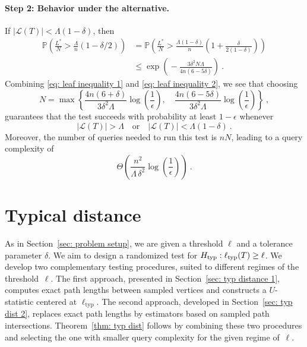 \documentclass[12pt]{article}
\begin{document}
\paragraph{Step 2: Behavior under the alternative.}    If $|\mathcal{L}(T)| < \Lambda(1-\delta)$, then
    \begin{align}
        \mathbb{P}\!\left(\frac{L^*}{N} > \frac{\Lambda}{n}(1-\delta/2)\right) 
        &= \mathbb{P}\!\left(\frac{L^*}{N} > \frac{\Lambda(1-\delta)}{n}\left(1+\frac{\delta}{2(1-\delta)}\right)\right) \nonumber \\
        &\le \exp\!\left(\!-\frac{3\delta^2 N \Lambda}{4n(6-5\delta)}\right)~. \label{eq: leaf inequality 2}
    \end{align}
    Combining \eqref{eq: leaf inequality 1} and \eqref{eq: leaf inequality 2}, we see that choosing
    \[
        N 
        = \max\left\{
            \frac{4n(6+\delta)}{3\delta^2 \Lambda}\log\!\left(\frac{1}{\epsilon}\right),
            \quad
            \frac{4n(6-5\delta)}{3\delta^2 \Lambda}\log\!\left(\frac{1}{\epsilon}\right)
        \right\}~,
    \]
    guarantees that the test succeeds with probability at least $1-\epsilon$ whenever 
    \[
        |\mathcal{L}(T)| > \Lambda 
        \quad \text{or} \quad 
        |\mathcal{L}(T)| < \Lambda(1-\delta)~.
    \]
    Moreover, the number of queries needed to run this test is $nN$, leading to a query complexity of
\[
    \Theta\!\left( \frac{n^2}{\Lambda\,\delta^2}\log\!\left(\frac{1}{\epsilon}\right)\right)~.
\]



\section{Typical distance}\label{sec: Testing typical distance}

As in Section~\ref{sec: problem setup}, we are given a threshold $\ell$ and a tolerance parameter $\delta$. We aim to design a randomized test for $H_{\rm typ}: \ell_{\rm typ}(T)\geq \ell$. We develop two complementary testing procedures, suited to different regimes of the threshold~$\ell$.
The first approach, presented in Section~\ref{sec: typ distance 1}, computes exact path lengths between sampled vertices and constructs a $U$-statistic centered at $\ell_{\mathrm{typ}}$.
The second approach, developed in Section~\ref{sec: typ dist 2}, replaces exact path lengths by estimators based on sampled path intersections.
Theorem~\ref{thm: typ dist} follows by combining these two procedures and selecting the one with smaller query complexity for the given regime of~$\ell$.
\end{document}
